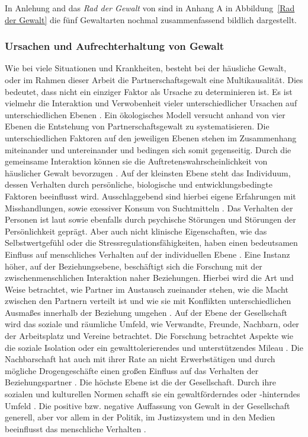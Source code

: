 In Anlehung and das \textit{Rad der Gewalt} von \textcite{Rad_der_Gewalt} sind in Anhang A in Abbildung~\ref{Rad der Gewalt} die fünf Gewaltarten nochmal zusammenfassend bildlich dargestellt. %

\subsubsection{Ursachen und Aufrechterhaltung von Gewalt}     \label{2.1.2.2}
Wie bei viele Situationen und Krankheiten, besteht bei der häusliche Gewalt, oder im Rahmen dieser Arbeit die Partnerschaftsgewalt eine Multikausalität. Dies bedeutet, dass nicht ein einziger Faktor als Ursache zu determinieren ist. Es ist vielmehr die Interaktion und Verwobenheit vieler unterschiedlicher Ursachen auf unterschiedlichen Ebenen \parencite{Ursache_hG}. Ein ökologisches Modell versucht anhand von vier Ebenen die Entstehung von Partnerschaftsgewalt zu systematisieren. Die unterschiedlichen Faktoren auf den jeweiligen Ebenen stehen im Zusammenhang miteinander und untereinander und bedingen sich somit gegenseitig. Durch die gemeinsame Interaktion können sie die Auftretenswahrscheinlichkeit von häuslicher Gewalt bevorzugen \parencite{Ursache_hG_2, Ursache_hG, Gewaltart}.
Auf der kleinsten Ebene steht das Individuum, dessen Verhalten durch persönliche, biologische und entwicklungsbedingte Faktoren beeinflusst wird. Ausschlaggebend sind hierbei eigene Erfahrungen mit Misshandlungen, sowie exessiver Konsum von Suchtmitteln \parencite{Ursache_hG_2, Ursache_hG, Gewaltart}. Das Verhalten der Personen ist laut \textcite{Gewaltart} sowie \textcite{Ursache_hG_2} ebenfalls durch psychische Störungen und Störungen der Persönlichkeit geprägt. Aber auch nicht klinische Eigenschaften, wie das Selbstwertgefühl oder die Stressregulationsfähigkeiten, haben einen bedeutsamen Einfluss auf menschliches Verhalten auf der individuellen Ebene \parencite{Ursache_hG}.
Eine Instanz höher, auf der Beziehungsebene, beschäftigt sich die Forschung mit der zwischenmenschlichen Interaktion naher Beziehungen. Hierbei wird die Art und Weise betrachtet, wie Partner im Austausch zueinander stehen, wie die Macht zwischen den Partnern verteilt ist und wie sie mit Konflikten unterschiedlichen Ausmaßes innerhalb der Beziehung umgehen \parencite{Ursache_hG_2, Ursache_hG, Gewaltart}.
Auf der Ebene der Gesellschaft wird das soziale und räumliche Umfeld, wie Verwandte, Freunde, Nachbarn, oder der Arbeitsplatz und Vereine betrachtet. Die Forschung betrachtet Aspekte wie die soziale Isolation oder ein gewalttolerierendes und unterstützendes Mileau \parencite{Ursache_hG_2, Ursache_hG, Gewaltart}. Die Nachbarschaft hat auch mit ihrer Rate an nicht Erwerbstätigen und durch mögliche Drogengeschäfte einen großen Einfluss auf das Verhalten der Beziehungspartner \parencite{Ursache_hG, Gewaltart}.
Die höchste Ebene ist die der Gesellschaft. Durch ihre sozialen und kulturellen Normen schafft sie ein gewaltförderndes oder -hinterndes Umfeld \parencite{Ursache_hG_2, Ursache_hG, Gewaltart}. Die positive bzw. negative Auffassung von Gewalt in der Gesellschaft generell, aber vor allem in der Politik, im Justizsystem und in den Medien beeinflusst das menschliche Verhalten \parencite{Ursache_hG_2, Ursache_hG}.  

